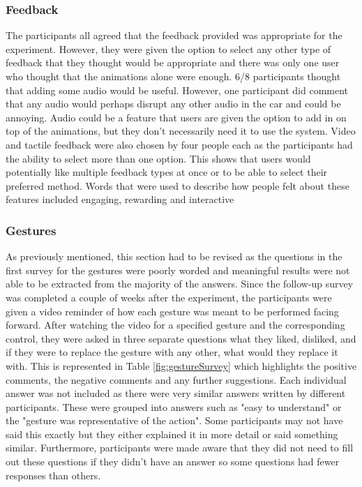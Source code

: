 \documentclass{l4proj}
\begin{document}
\subsubsection{Feedback}
The participants all agreed that the feedback provided was appropriate for the experiment. However, they were given the option to select any other type of feedback that they thought would be appropriate and there was only one user who thought that the animations alone were enough. 6/8 participants thought that adding some audio would be useful. However, one participant did comment that any audio would perhaps disrupt any other audio in the car and could be annoying. Audio could be a feature that users are given the option to add in on top of the animations, but they don’t necessarily need it to use the system. 
Video and tactile feedback were also chosen by four people each as the participants had the ability to select more than one option. This shows that users would potentially like multiple feedback types at once or to be able to select their preferred method.
Words that were used to describe how people felt about these features included engaging, rewarding and interactive

\subsubsection{Gestures}
As previously mentioned, this section had to be revised as the questions in the first survey for the gestures were poorly worded and meaningful results were not able to be extracted from the majority of the answers. Since the follow-up survey was completed a couple of weeks after the experiment, the participants were given a video reminder of how each gesture was meant to be performed facing forward. After watching the video for a specified gesture and the corresponding control, they were asked in three separate questions what they liked, disliked, and if they were to replace the gesture with any other, what would they replace it with. This is represented in Table \ref{fig:gestureSurvey} which highlights the positive comments, the negative comments and any further suggestions. Each individual answer was not included as there were very similar answers written by different participants. These were grouped into answers such as "easy to understand" or the "gesture was representative of the action". Some participants may not have said this exactly but they either explained it in more detail or said something similar. Furthermore, participants were made aware that they did not need to fill out these questions if they didn't have an answer so some questions had fewer responses than others.
\end{document}
